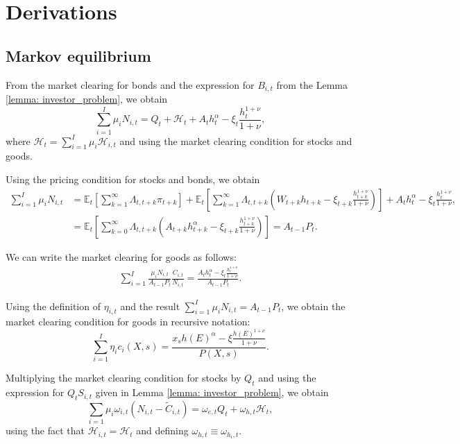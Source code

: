 \section{Derivations}

\subsection{Markov equilibrium}\label{app:markov}

From the market clearing for bonds and the expression for $B_{i,t}$ from the Lemma \ref{lemma: investor_problem}, we obtain
\begin{equation}\nonumber
    \sum_{i=1}^I \mu_{i} N_{i,t} = Q_t + \mathcal{H}_t + A_t h_t^\alpha - \xi_t \frac{h_t^{1+\nu}}{1+\nu},
\end{equation}
where $\mathcal{H}_t = \sum_{i=1}^I \mu_i \mathcal{H}_{i,t}$ and using the market clearing condition for stocks and goods.

Using the pricing condition for stocks and bonds, we obtain
\begin{align}
    \sum_{i=1}^I \mu_{i} N_{i,t} &= \mathbb{E}_t\left[ \sum_{k=1}^\infty \Lambda_{t,t+k} \pi_{t+k}\right] +\mathbb{E}_t\left[ \sum_{k=1}^\infty \Lambda_{t,t+k} \left( W_{t+k} h_{t+k} - \xi_{t+k} \frac{h_{t+k}^{1+\nu}}{1+\nu} \right)\right]+ A_t h_t^\alpha - \xi_t \frac{h_t^{1+\nu}}{1+\nu},\nonumber\\
    &= \mathbb{E}_t\left[ \sum_{k=0}^\infty \Lambda_{t,t+k} \left( A_{t+k} h_{t+k}^\alpha -\xi_{t+k} \frac{h_{t+k}^{1+\nu}}{1+\nu}  \right)\right] = A_{t-1} P_{t}.
\end{align}

We can write the market clearing for goods as follows:
\begin{align}
    \sum_{i=1}^I \frac{\mu_i N_{i,t}}{A_{t-1} P_t} \frac{C_{i,t}}{N_{i,t}} = \frac{A_t h_t^\alpha - \xi_t \frac{h_t^{1+\nu}}{1+\nu}}{A_{t-1} P_t}.
\end{align}

Using the definition of $\eta_{i,t}$  and the result $\sum_{i=1}^I \mu_{i} N_{i,t}  = A_{t-1} P_t$, we obtain the market clearing condition for goods in recursive notation:
\begin{equation}
    \sum_{i=1}^I \eta_{i} c_{i}(X,s) = \frac{x_s h(E)^\alpha - \xi \frac{h(E)^{1+\nu}}{1+\nu}}{P(X,s)}.
\end{equation}

Multiplying the market clearing condition for stocks by $Q_t$ and using the expression for $Q_t S_{i,t}$ given in Lemma \ref{lemma: investor_problem}, we obtain
\begin{equation}
    \sum_{i=1} \mu_i \omega_{i,t} (N_{i,t} - \tilde{C}_{i,t})  = \omega_{e,t} Q_t + \omega_{h,t}\mathcal{H}_{t},
\end{equation}
using the fact that $\mathcal{H}_{i,t} = \mathcal{H}_t$ and defining $\omega_{h,t} \equiv \omega_{h_i,t}$.

